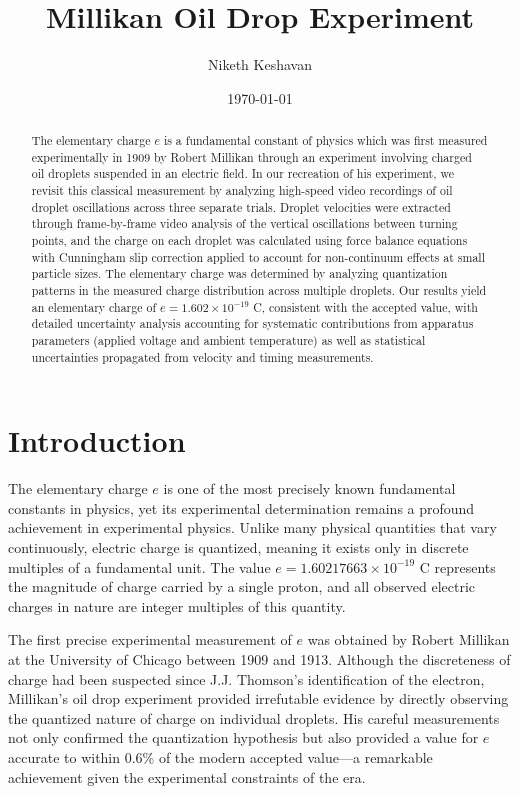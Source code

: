 \documentclass[11pt]{article}
\begin{document}
\title{Millikan Oil Drop Experiment}
\author{Niketh Keshavan}
\date{\today}
\maketitle

\begin{abstract}

The elementary charge $e$ is a fundamental constant of physics which was first measured experimentally in 1909 by Robert Millikan through an experiment involving charged oil droplets suspended in an electric field. In our recreation of his experiment, we revisit this classical measurement by analyzing high-speed video recordings of oil droplet oscillations across three separate trials. Droplet velocities were extracted through frame-by-frame video analysis of the vertical oscillations between turning points, and the charge on each droplet was calculated using force balance equations with Cunningham slip correction applied to account for non-continuum effects at small particle sizes. The elementary charge was determined by analyzing quantization patterns in the measured charge distribution across multiple droplets. Our results yield an elementary charge of $e = 1.602 \times 10^{-19}$ C, consistent with the accepted value, with detailed uncertainty analysis accounting for systematic contributions from apparatus parameters (applied voltage and ambient temperature) as well as statistical uncertainties propagated from velocity and timing measurements.

\end{abstract}

\newpage
\section{Introduction}

The elementary charge $e$ is one of the most precisely known fundamental constants in physics, yet its experimental determination remains a profound achievement in experimental physics. Unlike many physical quantities that vary continuously, electric charge is quantized, meaning it exists only in discrete multiples of a fundamental unit. The value $e = 1.60217663 \times 10^{-19}$ C represents the magnitude of charge carried by a single proton, and all observed electric charges in nature are integer multiples of this quantity.

The first precise experimental measurement of $e$ was obtained by Robert Millikan at the University of Chicago between 1909 and 1913. Although the discreteness of charge had been suspected since J.J. Thomson's identification of the electron, Millikan's oil drop experiment provided irrefutable evidence by directly observing the quantized nature of charge on individual droplets. His careful measurements not only confirmed the quantization hypothesis but also provided a value for $e$ accurate to within 0.6\% of the modern accepted value—a remarkable achievement given the experimental constraints of the era.
\end{document}
